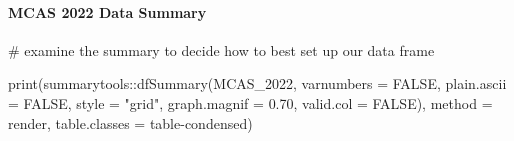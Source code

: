 \documentclass[
  letterpaper,
  DIV=11,
  numbers=noendperiod]{scrartcl}
\let\oldparagraph\paragraph
\renewcommand{\paragraph}[1]{\oldparagraph{#1}\mbox{}}
\newenvironment{Shaded}{\begin{snugshade}}{\end{snugshade}}
\newcommand{\AttributeTok}[1]{\textcolor[rgb]{0.40,0.45,0.13}{#1}}
\newcommand{\CommentTok}[1]{\textcolor[rgb]{0.37,0.37,0.37}{#1}}
\newcommand{\ConstantTok}[1]{\textcolor[rgb]{0.56,0.35,0.01}{#1}}
\newcommand{\FloatTok}[1]{\textcolor[rgb]{0.68,0.00,0.00}{#1}}
\newcommand{\FunctionTok}[1]{\textcolor[rgb]{0.28,0.35,0.67}{#1}}
\newcommand{\NormalTok}[1]{\textcolor[rgb]{0.00,0.23,0.31}{#1}}
\newcommand{\SpecialCharTok}[1]{\textcolor[rgb]{0.37,0.37,0.37}{#1}}
\newcommand{\StringTok}[1]{\textcolor[rgb]{0.13,0.47,0.30}{#1}}
\begin{document}
\hypertarget{mcas-2022-data-summary}{%
\paragraph{MCAS 2022 Data Summary}\label{mcas-2022-data-summary}}

\begin{Shaded}
\begin{Highlighting}[]
\CommentTok{\# examine the summary to decide how to best set up our data frame}

 \FunctionTok{print}\NormalTok{(summarytools}\SpecialCharTok{::}\FunctionTok{dfSummary}\NormalTok{(MCAS\_2022,}
                         \AttributeTok{varnumbers =} \ConstantTok{FALSE}\NormalTok{,}
                         \AttributeTok{plain.ascii  =} \ConstantTok{FALSE}\NormalTok{,}
                         \AttributeTok{style        =} \StringTok{"grid"}\NormalTok{,}
                         \AttributeTok{graph.magnif =} \FloatTok{0.70}\NormalTok{,}
                        \AttributeTok{valid.col    =} \ConstantTok{FALSE}\NormalTok{),}
       \AttributeTok{method =} \StringTok{\textquotesingle{}render\textquotesingle{}}\NormalTok{,}
       \AttributeTok{table.classes =} \StringTok{\textquotesingle{}table{-}condensed\textquotesingle{}}\NormalTok{)}
\end{Highlighting}
\end{Shaded}
\end{document}
